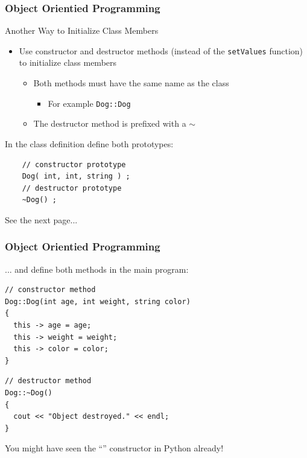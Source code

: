 \documentclass[compress]{beamer}
\begin{document}
\begin{frame}[fragile]
	\frametitle{Object Orientied Programming}
\begin{exampleblock}{Another Way to Initialize Class Members}
\begin{itemize}
\item Use constructor and destructor methods (instead of the \texttt{setValues} function) to initialize class members
\begin{itemize}
	\item Both methods must have the same name as the class
	\begin{itemize}
		\item For example \texttt{Dog::Dog}
	\end{itemize}
	\item The destructor method is prefixed with a $\sim$
\end{itemize}
\end{itemize}
\end{exampleblock}

In the class definition define both prototypes:
	\begin{lstlisting}
	// constructor prototype
	Dog( int, int, string ) ;
	// destructor prototype
	~Dog() ;
	\end{lstlisting}

See the next page...

\end{frame}

\begin{frame}[fragile]
	\frametitle{Object Orientied Programming}


... and define both methods in the main program:
\begin{lstlisting}
// constructor method
Dog::Dog(int age, int weight, string color) 
{ 
  this -> age = age;
  this -> weight = weight;
  this -> color = color;
}
\end{lstlisting}

\begin{lstlisting}
// destructor method
Dog::~Dog()
{
  cout << "Object destroyed." << endl;
}
\end{lstlisting}

You might have seen the ``'' constructor in Python already!
	
\end{frame}
\end{document}
